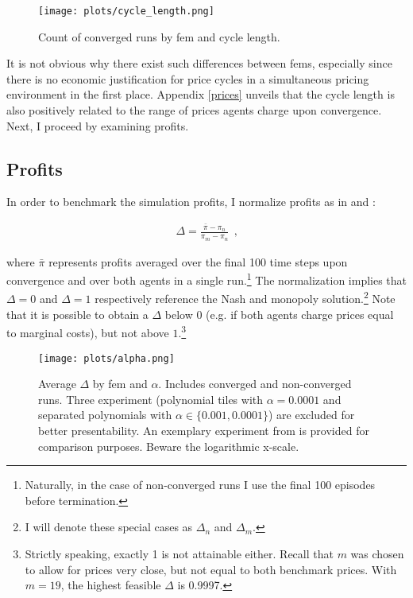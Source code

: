 \begin{figure}
	\texttt{[image: plots/cycle\_length.png]}
	\caption[Count of converged runs by \gls{fem} and cycle length]{Count of converged runs by \gls{fem} and cycle length.}
	\label{cycle_length}
\end{figure}


It is not obvious why there exist such differences between \gls{fem}s, especially since there is no economic justification for price cycles in a simultaneous pricing environment in the first place. Appendix \ref{prices} unveils that the cycle length is also positively related to the range of prices agents charge upon convergence. Next, I proceed by examining profits.

\subsection{Profits}\label{profits}

In order to benchmark the simulation profits, I normalize profits as in \textcite[p.3277]{calvano_artificial_2020} and \textcite[p.3]{hettich_algorithmic_2021}:

\begin{gather}
\Delta = \frac{\bar{\pi} - \pi_n}{\pi_m - \pi_n} ~~ \text{,}
\end{gather}

where $\bar{\pi}$ represents profits averaged over the final 100 time steps upon convergence and over both agents in a single run.\footnote{Naturally, in the case of non-converged runs I use the final 100 episodes before termination.} The normalization implies that $\Delta = 0$ and $\Delta = 1$ respectively reference the Nash and monopoly solution.\footnote{I will denote these special cases as $\Delta_n$ and $\Delta_m$.} Note that it is possible to obtain a $\Delta$ below $0$ (e.g. if both agents charge prices equal to marginal costs), but not above $1$.\footnote{Strictly speaking, exactly 1 is not attainable either. Recall that $m$ was chosen to allow for prices very close, but not equal to both benchmark prices. With $m = 19$, the highest feasible $\Delta$ is 0.9997.}

\begin{figure}
	\texttt{[image: plots/alpha.png]}
	\caption[Average $\Delta$ by \gls{fem} and $\alpha$]{Average $\Delta$ by \gls{fem} and $\alpha$. Includes converged and non-converged runs. Three experiment (polynomial tiles with $\alpha = 0.0001$ and separated polynomials with $\alpha \in \{0.001, 0.0001\}$) are excluded for better presentability. An exemplary experiment from \textcite{calvano_artificial_2020} is provided for comparison purposes. Beware the logarithmic x-scale.}
	\label{alpha}
\end{figure}

